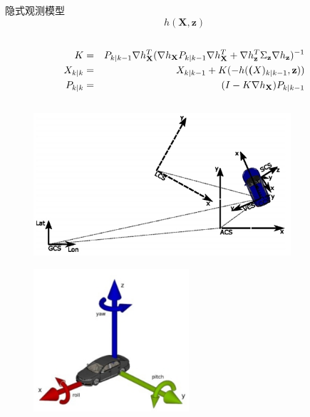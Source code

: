 \documentclass[12pt,a4paper]{article}
\newcommand{\zhiv}{\fontsize{12pt}{18pt}\selectfont}      %
\begin{document}
{{{隐式观测模型
\[
    h(\textbf{X},\textbf{z})
\]

{\subsection{\textbf{\song\zhiv{更新}}}}
\begin{eqnarray}
K &=& P_{k|k-1} \nabla h_\textbf{X}^T (\nabla h_\textbf{X} P_{k|k-1}\nabla h_\textbf{X}^T+\nabla h_\textbf{z}^T \Sigma_\textbf{z} \nabla h_\textbf{z} )^{-1}\\
X_{k|k} &=& X_{k|k-1}+K(-h(\textbf(X)_{k|k-1},\textbf{z})) \\
P_{k|k} &=& (I-K\nabla h_\textbf{X})P_{k|k-1}
\end{eqnarray}
{\subsection{\textbf{\song\zhiv{参考坐标系}}}}
\begin{figure}[!htb]
  \centering
  \includegraphics[height=150pt]{coordinate_system.jpg}
\end{figure}
\begin{figure}[!htb]
  \centering
  \includegraphics[height=150pt]{vcs.jpg}
\end{figure}


\section{\textbf{\song{\zhiv 附录}}}

}}}
\end{document}
